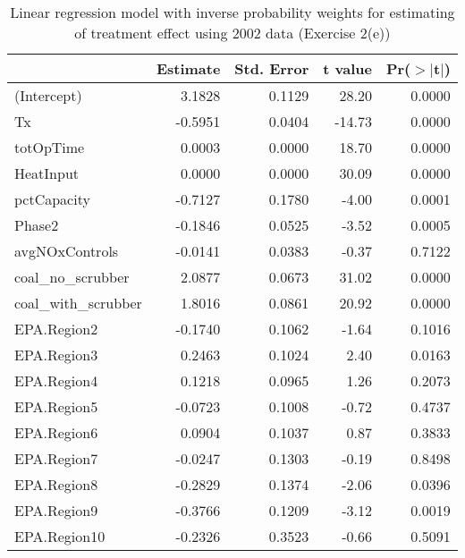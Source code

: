\begin{table}[ht]
\centering
\begin{tabular}{lrrrr}
  \toprule
 & Estimate & Std. Error & t value & Pr($>$$|$t$|$) \\ 
  \midrule
(Intercept) & 3.1828 & 0.1129 & 28.20 & 0.0000 \\ 
  Tx & -0.5951 & 0.0404 & -14.73 & 0.0000 \\ 
  totOpTime & 0.0003 & 0.0000 & 18.70 & 0.0000 \\ 
  HeatInput & 0.0000 & 0.0000 & 30.09 & 0.0000 \\ 
  pctCapacity & -0.7127 & 0.1780 & -4.00 & 0.0001 \\ 
  Phase2 & -0.1846 & 0.0525 & -3.52 & 0.0005 \\ 
  avgNOxControls & -0.0141 & 0.0383 & -0.37 & 0.7122 \\ 
  coal\_no\_scrubber & 2.0877 & 0.0673 & 31.02 & 0.0000 \\ 
  coal\_with\_scrubber & 1.8016 & 0.0861 & 20.92 & 0.0000 \\ 
  EPA.Region2 & -0.1740 & 0.1062 & -1.64 & 0.1016 \\ 
  EPA.Region3 & 0.2463 & 0.1024 & 2.40 & 0.0163 \\ 
  EPA.Region4 & 0.1218 & 0.0965 & 1.26 & 0.2073 \\ 
  EPA.Region5 & -0.0723 & 0.1008 & -0.72 & 0.4737 \\ 
  EPA.Region6 & 0.0904 & 0.1037 & 0.87 & 0.3833 \\ 
  EPA.Region7 & -0.0247 & 0.1303 & -0.19 & 0.8498 \\ 
  EPA.Region8 & -0.2829 & 0.1374 & -2.06 & 0.0396 \\ 
  EPA.Region9 & -0.3766 & 0.1209 & -3.12 & 0.0019 \\ 
  EPA.Region10 & -0.2326 & 0.3523 & -0.66 & 0.5091 \\ 
   \bottomrule
\end{tabular}
\caption{Linear regression model with inverse probability weights for estimating of treatment effect using 2002 data (Exercise 2(e))} 
\label{tab:lm-2e-02}
\end{table}

